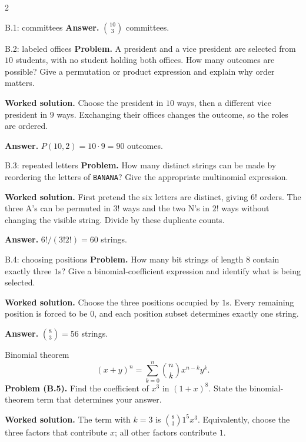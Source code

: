 \documentclass[10pt]{article}
\begin{document}
\begin{multicols}{2}
\begin{workedbox}{B.1: committees}
\textbf{Answer.} $\binom{10}{3}$ committees.
\end{workedbox}

\begin{workedbox}{B.2: labeled offices}
\textbf{Problem.} A president and a vice president are selected from $10$ students, with no student holding both offices. How many outcomes are possible? Give a permutation or product expression and explain why order matters.

\textbf{Worked solution.} Choose the president in $10$ ways, then a different vice president in $9$ ways. Exchanging their offices changes the outcome, so the roles are ordered.

\textbf{Answer.} $P(10,2)=10\cdot9=90$ outcomes.
\end{workedbox}

\begin{workedbox}{B.3: repeated letters}
\textbf{Problem.} How many distinct strings can be made by reordering the letters of \texttt{BANANA}? Give the appropriate multinomial expression.

\textbf{Worked solution.} First pretend the six letters are distinct, giving $6!$ orders. The three A's can be permuted in $3!$ ways and the two N's in $2!$ ways without changing the visible string. Divide by these duplicate counts.

\textbf{Answer.} $6!/(3!2!)=60$ strings.
\end{workedbox}

\begin{workedbox}{B.4: choosing positions}
\textbf{Problem.} How many bit strings of length $8$ contain exactly three $1$s? Give a binomial-coefficient expression and identify what is being selected.

\textbf{Worked solution.} Choose the three positions occupied by $1$s. Every remaining position is forced to be $0$, and each position subset determines exactly one string.

\textbf{Answer.} $\binom83=56$ strings.
\end{workedbox}

\begin{definitionbox}{Binomial theorem}
\[
(x+y)^n=\sum_{k=0}^{n}\binom nk x^{n-k}y^k.
\]
\textbf{Problem (B.5).} Find the coefficient of $x^3$ in $(1+x)^8$. State the binomial-theorem term that determines your answer.

\textbf{Worked solution.} The term with $k=3$ is $\binom83 1^5x^3$. Equivalently, choose the three factors that contribute $x$; all other factors contribute $1$.


\end{definitionbox}
\end{multicols}
\end{document}
